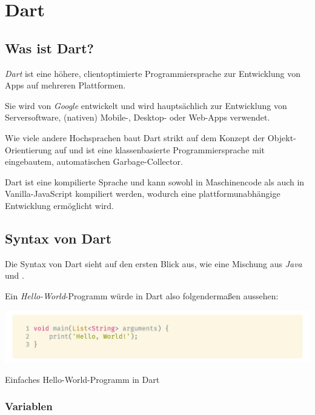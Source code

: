 \section{Dart}
\label{dart}

\subsection{Was ist Dart?}

\textit{Dart} ist eine höhere, clientoptimierte Programmiersprache zur Entwicklung von Apps auf mehreren Plattformen.

Sie wird von \textit{Google} entwickelt und wird hauptsächlich zur Entwicklung von Serversoftware, (nativen) Mobile-, Desktop- oder Web-Apps verwendet.

Wie viele andere Hochsprachen baut Dart strikt auf dem Konzept der Objekt-Orientierung auf und ist eine klassenbasierte Programmiersprache mit eingebautem, automatischen
Garbage-Collector.

Dart ist eine kompilierte Sprache und kann sowohl in Maschinencode als auch in Vanilla-JavaScript kompiliert werden, wodurch eine plattformunabhängige Entwicklung ermöglicht 
wird.~\cite{dartoverview2021}

\subsection{Syntax von Dart}

Die Syntax von Dart sieht auf den ersten Blick aus, wie eine Mischung aus \textit{Java} und .

Ein \textit{Hello-World}-Programm würde in Dart also folgendermaßen aussehen:

\begin{code}[h]
    \centering
    \includegraphics[width=1\textwidth]{images/Dart/theory/dartHelloWorld.png}
    \vspace{-25pt}
    \caption{Einfaches Hello-World-Programm in Dart}
\end{code}

\subsubsection{Variablen}

